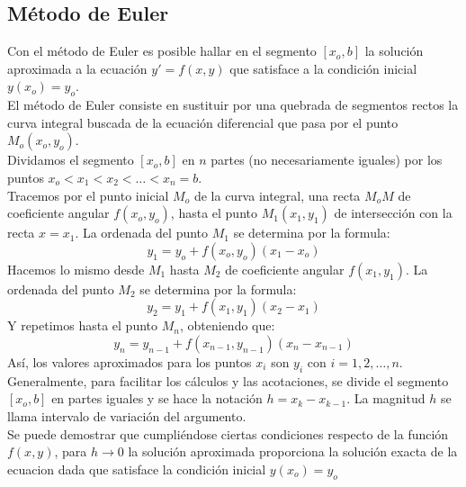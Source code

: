 \documentclass[10pt]{article}
\begin{document}
\begin{multicols}{2}
			\subsection{Método de Euler}
				Con el método de Euler es posible hallar en el segmento $[x_o,b]$ la solución aproximada a la ecuación $y'=f(x,y)$ que satisface a la condición inicial $y(x_o)=y_o$.\\
				El método de Euler consiste en sustituir por una quebrada de segmentos rectos la curva integral buscada de la ecuación diferencial que pasa por el punto $M_o(x_o,y_o)$.\\
				Dividamos el segmento $[x_o,b]$ en $n$ partes (no necesariamente iguales) por los puntos $x_o<x_1<x_2<\dots<x_n=b$.\\
				Tracemos por el punto inicial $M_o$ de la curva integral, una recta $M_oM$ de coeficiente angular $f(x_o,y_o)$, hasta el punto $M_1(x_1,y_1)$ de intersección con la recta $x=x_1$. La ordenada del punto $M_1$ se determina por la formula:
				$$y_1=y_o+f(x_o,y_o)(x_1-x_o)$$
				Hacemos lo mismo desde $M_1$ hasta $M_2$ de coeficiente angular $f(x_1,y_1)$. La ordenada del punto $M_2$ se determina por la formula:
				$$y_2=y_1+f(x_1,y_1)(x_2-x_1)$$
				Y repetimos hasta el punto $M_n$, obteniendo que:
				$$y_n=y_{n-1}+f(x_{n-1},y_{n-1})(x_n-x_{n-1})$$
				Así, los valores aproximados para los puntos $x_i$ son $y_i$ con $i=1,2,\dots,n$.\\
				Generalmente, para facilitar los cálculos y las acotaciones, se divide el segmento $[x_o,b]$ en partes iguales y se hace la notación $h=x_k-x_{k-1}$. La magnitud $h$ se llama intervalo de variación del argumento.\\
				Se puede demostrar que cumpliéndose ciertas condiciones respecto de la función $f(x,y)$, para $h\to 0$ la solución aproximada proporciona la solución exacta de la ecuacion dada que satisface la condición inicial $y(x_o)=y_o$

\end{multicols}
\end{document}

